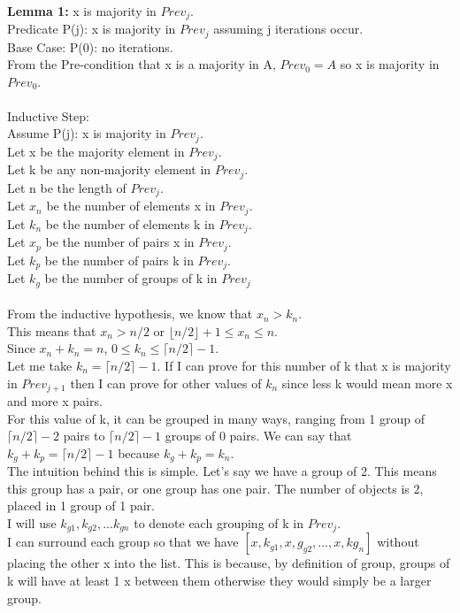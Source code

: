 \documentclass[12pt]{article}
\begin{document}
\\
\textbf{Lemma 1:} x is majority in $Prev_j$.\\
Predicate P(j): x is majority in $Prev_j$ assuming j iterations occur.\\
Base Case: P(0): no iterations.\\
From the Pre-condition that x is a majority in A, $Prev_0 = A$ so x is majority in $Prev_0$.\\
\\
Inductive Step:\\
Assume P(j): x is majority in $Prev_j$.\\
Let x be the majority element in $Prev_j$.\\
Let k be any non-majority element in $Prev_j$.\\
Let n be the length of $Prev_j$.\\
Let $x_n$ be the number of elements x in $Prev_j$.\\
Let $k_n$ be the number of elements k in $Prev_j$.\\
Let $x_p$ be the number of pairs x in $Prev_j$.\\
Let $k_p$ be the number of pairs k in $Prev_j$.\\
Let $k_g$ be the number of groups of k in $Prev_j$\\
\\
From the inductive hypothesis, we know that $x_n > k_n$.\\
This means that $x_n > n/2$ or $\lfloor n/2 \rfloor + 1 \leq x_n \leq n$.\\
Since $x_n + k_n = n$, $0 \leq k_n \leq \lceil n/2 \rceil - 1$.\\
Let me take $k_n = \lceil n/2 \rceil - 1$. If I can prove for this number of k that x is majority in $Prev_{j+1}$ then I can prove for other values of $k_n$ since less k would mean more x and more x pairs.\\
For this value of k, it can be grouped in many ways, ranging from 1 group of $\lceil n/2 \rceil - 2$ pairs to $\lceil n/2 \rceil - 1$ groups of 0 pairs. We can say that $k_g + k_p = \lceil n/2 \rceil -1$ because $k_g + k_p = k_n$.\\
The intuition behind this is simple. Let's say we have a group of 2. This means this group has a pair, or one group has one pair. The number of objects is 2, placed in 1 group of 1 pair.\\
I will use $k_{g1}, k_{g2}, ... k_{gn}$ to denote each grouping of k in $Prev_j$.\\
I can surround each group so that we have $[x, k_{g1}, x,g_{g2}, ..., x, k{g_n}]$ without placing the other x into the list. This is because, by definition of group, groups of k will have at least 1 x between them otherwise they would simply be a larger group.\\
\end{document}
